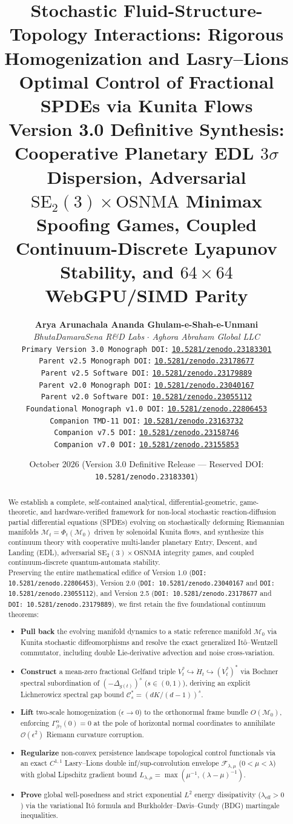 \documentclass[11pt,a4paper,reqno]{article}
\title{\textbf{\Large Stochastic Fluid-Structure-Topology Interactions: Rigorous Homogenization and Lasry--Lions Optimal Control of Fractional SPDEs via Kunita Flows}\\[1.2ex]
\large \textbf{Version 3.0 Definitive Synthesis: Cooperative Planetary EDL \texorpdfstring{$3\sigma$}{3-Sigma} Dispersion, Adversarial \texorpdfstring{$\mathrm{SE}_2(3) \times \mathrm{OSNMA}$}{SE2(3) x OSNMA} Minimax Spoofing Games, Coupled Continuum-Discrete Lyapunov Stability, and $64 \times 64$ WebGPU/SIMD Parity}}
\author{
  \textbf{Arya Arunachala Ananda Ghulam-e-Shah-e-Unmani}\\
  \textit{BhutaDamaraSena R\&D Labs} $\cdot$ \textit{Aghora Abraham Global LLC}\\
  \texttt{Primary Version 3.0 Monograph DOI:} \href{https://doi.org/10.5281/zenodo.23183301}{\texttt{10.5281/zenodo.23183301}}\\
  \texttt{Parent v2.5 Monograph DOI:} \href{https://doi.org/10.5281/zenodo.23178677}{\texttt{10.5281/zenodo.23178677}}\\
  \texttt{Parent v2.5 Software DOI:} \href{https://doi.org/10.5281/zenodo.23179889}{\texttt{10.5281/zenodo.23179889}}\\
  \texttt{Parent v2.0 Monograph DOI:} \href{https://doi.org/10.5281/zenodo.23040167}{\texttt{10.5281/zenodo.23040167}}\\
  \texttt{Parent v2.0 Software DOI:} \href{https://doi.org/10.5281/zenodo.23055112}{\texttt{10.5281/zenodo.23055112}}\\
  \texttt{Foundational Monograph v1.0 DOI:} \href{https://doi.org/10.5281/zenodo.22806453}{\texttt{10.5281/zenodo.22806453}}\\
  \texttt{Companion TMD-11 DOI:} \href{https://doi.org/10.5281/zenodo.23163732}{\texttt{10.5281/zenodo.23163732}}\\
  \texttt{Companion v7.5 DOI:} \href{https://doi.org/10.5281/zenodo.23158746}{\texttt{10.5281/zenodo.23158746}}\\
  \texttt{Companion v7.0 DOI:} \href{https://doi.org/10.5281/zenodo.23155853}{\texttt{10.5281/zenodo.23155853}}
}
\date{October 2026 (Version 3.0 Definitive Release --- Reserved DOI: \texttt{10.5281/zenodo.23183301})}
\theoremstyle{definition}
\theoremstyle{remark}
\begin{document}
\maketitle

\begin{abstract}
\noindent We establish a complete, self-contained analytical, differential-geometric, game-theoretic, and hardware-verified framework for non-local stochastic reaction-diffusion partial differential equations (SPDEs) evolving on stochastically deforming Riemannian manifolds $\mathcal{M}_t = \Phi_t(\mathcal{M}_0)$ driven by solenoidal Kunita flows, and synthesize this continuum theory with cooperative multi-lander planetary Entry, Descent, and Landing (EDL), adversarial $\mathrm{SE}_2(3) \times \mathrm{OSNMA}$ integrity games, and coupled continuum-discrete quantum-automata stability.\\[0.8ex]
\noindent Preserving the entire mathematical edifice of Version 1.0 (\texttt{DOI: 10.5281/zenodo.22806453}), Version 2.0 (\texttt{DOI: 10.5281/zenodo.23040167} and \texttt{DOI: 10.5281/zenodo.23055112}), and Version 2.5 (\texttt{DOI: 10.5281/zenodo.23178677} and \texttt{DOI: 10.5281/zenodo.23179889}), we first retain the five foundational continuum theorems:
\begin{itemize}
    \setlength\itemsep{0em}
    \item[(i)] \textbf{Pull back} the evolving manifold dynamics to a static reference manifold $\mathcal{M}_0$ via Kunita stochastic diffeomorphisms and resolve the exact generalized It\^o--Wentzell commutator, including double Lie-derivative advection and noise cross-variation.
    \item[(ii)] \textbf{Construct} a mean-zero fractional Gelfand triple $\dot{V}_t^s \hookrightarrow \dot{H}_t \hookrightarrow (\dot{V}_t^s)^*$ via Bochner spectral subordination of $(-\Delta_{g(t)})^s$ ($s \in (0,1)$), deriving an explicit Lichnerowicz spectral gap bound $\mathcal{C}_s^* = (dK/(d-1))^s$.
    \item[(iii)] \textbf{Lift} two-scale homogenization ($\epsilon \to 0$) to the orthonormal frame bundle $O(\mathcal{M}_0)$, enforcing $\Gamma_{\beta\gamma}^\alpha(0) = 0$ at the pole of horizontal normal coordinates to annihilate $\mathcal{O}(\epsilon^2)$ Riemann curvature corruption.
    \item[(iv)] \textbf{Regularize} non-convex persistence landscape topological control functionals via an exact $C^{1,1}$ Lasry--Lions double inf/sup-convolution envelope $\mathcal{F}_{\lambda,\mu}$ ($0 < \mu < \lambda$) with global Lipschitz gradient bound $L_{\lambda,\mu} = \max(\mu^{-1}, (\lambda-\mu)^{-1})$.
    \item[(v)] \textbf{Prove} global well-posedness and strict exponential $L^2$ energy dissipativity ($\lambda_{\mathrm{eff}} > 0$) via the variational It\^o formula and Burkholder--Davis--Gundy (BDG) martingale inequalities.
\end{itemize}


\end{abstract}
\end{document}
